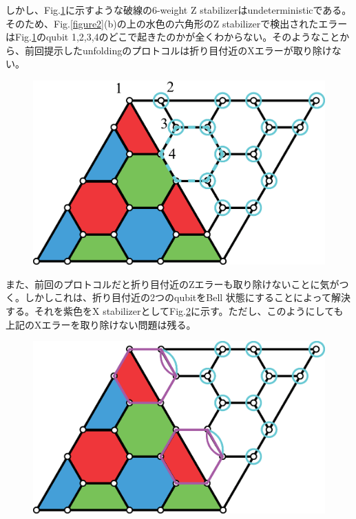 \documentclass[a4paper,10pt]{ltjsarticle}
\begin{document}
{    しかし、Fig.\ref{figure3}に示すような破線の6-weight Z stabilizerはundeterministicである。そのため、Fig.\ref{figure2}(b)の上の水色の六角形のZ stabilizerで検出されたエラーはFig.\ref{figure3}のqubit 1,2,3,4のどこで起きたのかが全くわからない。そのようなことから、前回提示したunfoldingのプロトコルは折り目付近のXエラーが取り除けない。

    \begin{figure}[h]
        \centering
        \includegraphics[scale=0.25]{figure/figure3.eps}
        \caption{ }
        \label{figure3}
    \end{figure}

    \clearpage

    また、前回のプロトコルだと折り目付近のZエラーも取り除けないことに気がつく。しかしこれは、折り目付近の2つのqubitをBell 状態にすることによって解決する。それを紫色をX stabilizerとしてFig.\ref{figure4}に示す。ただし、このようにしても上記のXエラーを取り除けない問題は残る。
    
    \begin{figure}[h]
        \centering
        \includegraphics[scale=0.25]{figure/figure4.eps}
        \caption{ }
        \label{figure4}
    \end{figure}

}
\end{document}
